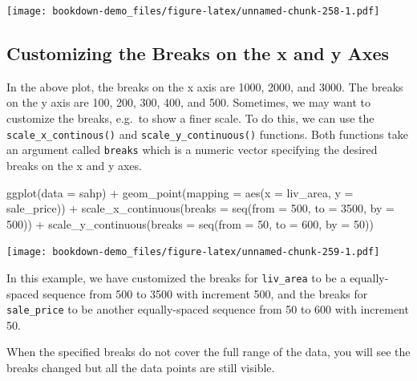 \documentclass[
]{book}
\newenvironment{Shaded}{\begin{snugshade}}{\end{snugshade}}
\newcommand{\AttributeTok}[1]{\textcolor[rgb]{0.77,0.63,0.00}{#1}}
\newcommand{\DecValTok}[1]{\textcolor[rgb]{0.00,0.00,0.81}{#1}}
\newcommand{\FunctionTok}[1]{\textcolor[rgb]{0.00,0.00,0.00}{#1}}
\newcommand{\NormalTok}[1]{#1}
\newcommand{\SpecialCharTok}[1]{\textcolor[rgb]{0.00,0.00,0.00}{#1}}
\begin{document}
\texttt{[image: bookdown-demo\_files/figure-latex/unnamed-chunk-258-1.pdf]}

\hypertarget{customizing-the-breaks-on-the-x-and-y-axes}{%
\subsection{Customizing the Breaks on the x and y Axes}\label{customizing-the-breaks-on-the-x-and-y-axes}}

In the above plot, the breaks on the x axis are 1000, 2000, and 3000. The breaks on the y axis are 100, 200, 300, 400, and 500. Sometimes, we may want to customize the breaks, e.g.~to show a finer scale. To do this, we can use the \texttt{scale\_x\_continous()} and \texttt{scale\_y\_continuous()} functions. Both functions take an argument called \texttt{breaks} which is a numeric vector specifying the desired breaks on the x and y axes.

\begin{Shaded}
\begin{Highlighting}[]
\FunctionTok{ggplot}\NormalTok{(}\AttributeTok{data =}\NormalTok{ sahp) }\SpecialCharTok{+} \FunctionTok{geom\_point}\NormalTok{(}\AttributeTok{mapping =} \FunctionTok{aes}\NormalTok{(}\AttributeTok{x =}\NormalTok{ liv\_area, }\AttributeTok{y =}\NormalTok{ sale\_price)) }\SpecialCharTok{+}
  \FunctionTok{scale\_x\_continuous}\NormalTok{(}\AttributeTok{breaks =} \FunctionTok{seq}\NormalTok{(}\AttributeTok{from =} \DecValTok{500}\NormalTok{, }\AttributeTok{to =} \DecValTok{3500}\NormalTok{, }\AttributeTok{by =} \DecValTok{500}\NormalTok{)) }\SpecialCharTok{+}
  \FunctionTok{scale\_y\_continuous}\NormalTok{(}\AttributeTok{breaks =} \FunctionTok{seq}\NormalTok{(}\AttributeTok{from =} \DecValTok{50}\NormalTok{, }\AttributeTok{to =} \DecValTok{600}\NormalTok{, }\AttributeTok{by =} \DecValTok{50}\NormalTok{))}
\end{Highlighting}
\end{Shaded}

\texttt{[image: bookdown-demo\_files/figure-latex/unnamed-chunk-259-1.pdf]}

In this example, we have customized the breaks for \texttt{liv\_area} to be a equally-spaced sequence from 500 to 3500 with increment 500, and the breaks for \texttt{sale\_price} to be another equally-spaced sequence from 50 to 600 with increment 50.

When the specified breaks do not cover the full range of the data, you will see the breaks changed but all the data points are still visible.
\end{document}
